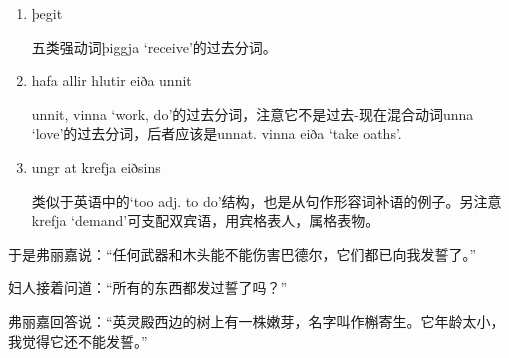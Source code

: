 \begin{grammar*}{}
    \begin{enumerate}[leftmargin=*]
        \item þegit

              五类强动词þiggja `receive'的过去分词。
        \item hafa allir hlutir eiða unnit

              unnit, vinna `work, do'的过去分词，注意它不是过去-现在混合动词unna `love'的过去分词，后者应该是unnat. vinna eiða `take oaths'.
        \item ungr at krefja eiðsins

              类似于英语中的`too adj. to do'结构，也是从句作形容词补语的例子。另注意krefja `demand'可支配双宾语，用宾格表人，属格表物。
    \end{enumerate}
\end{grammar*}
\begin{translation*}{}
    于是弗丽嘉说：“任何武器和木头能不能伤害巴德尔，它们都已向我发誓了。”

    妇人接着问道：“所有的东西都发过誓了吗？”

    弗丽嘉回答说：“英灵殿西边的树上有一株嫩芽，名字叫作槲寄生。它年龄太小，我觉得它还不能发誓。”
\end{translation*}

